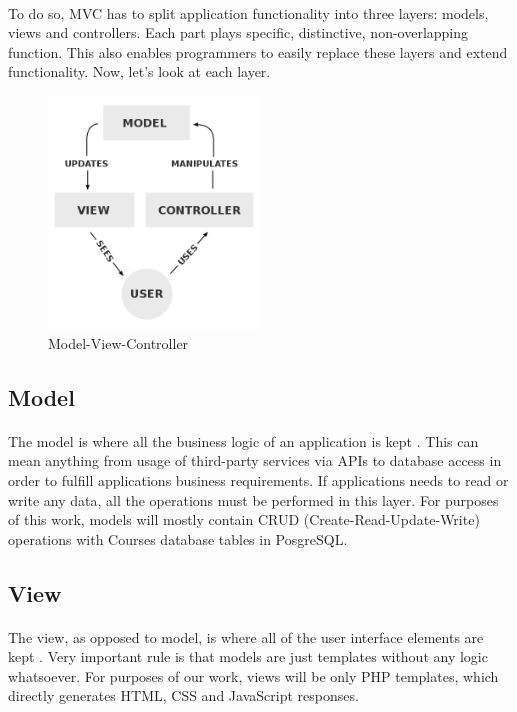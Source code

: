\paragraph{}
To do so, MVC has to split application functionality into three layers: models, views and controllers. Each part plays specific, distinctive, non-overlapping function. This also enables programmers to easily replace these layers and extend functionality. Now, let's look at each layer.

\begin{figure}[t]
    \centering
    \includegraphics[width=0.5\textwidth]{images/mvc.png}
    \caption{Model-View-Controller}
    \label{fig:mvc}
\end{figure}

\subsection{Model}
\paragraph{}
The model is where all the business logic of an application is kept \cite{phpmvc}. This can mean anything from usage of third-party services via APIs to database access in order to fulfill applications business requirements. If applications needs to read or write any data, all the operations must be performed in this layer. For purposes of this work, models will mostly contain CRUD (Create-Read-Update-Write) operations with Courses database tables in PosgreSQL.

\subsection{View}
\paragraph{}
The view, as opposed to model, is where all of the user interface elements are kept \cite{phpmvc}. Very important rule is that models are just templates without any logic whatsoever. For purposes of our work, views will be only PHP templates, which directly generates HTML, CSS and JavaScript responses.

